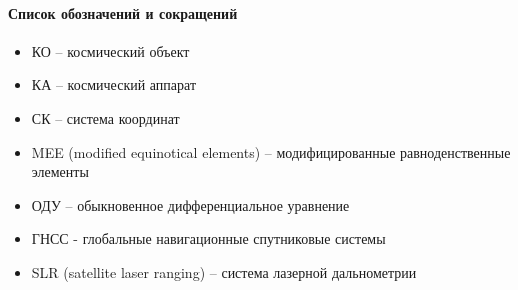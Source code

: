 \paragraph{Список обозначений и сокращений}

\begin{itemize}
    \item КО -- космический объект
    \item КА -- космический аппарат
    \item СК -- система координат
    \item MEE (modified equinotical elements) -- модифицированные равноденственные элементы
    \item ОДУ -- обыкновенное дифференциальное уравнение
    \item ГНСС - глобальные навигационные спутниковые системы
    \item SLR (satellite laser ranging) -- система лазерной дальнометрии
\end{itemize}

\newpage